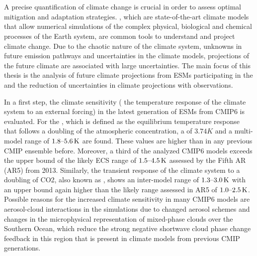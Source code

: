 


\chapter{\abstractname}

A precise quantification of climate change is crucial in order to assess
optimal mitigation and adaptation strategies. , which are
state-of-the-art climate models that allow numerical simulations of the complex
physical, biological and chemical processes of the Earth system, are common
tools to understand and project climate change. Due to the chaotic nature of
the climate system, unknowns in future emission pathways and uncertainties in
the climate models, projections of the future climate are associated with large
uncertainties. The main focus of this thesis is the analysis of future climate
projections from \acsp{ESM} participating in the  and the
reduction of uncertainties in climate projections with observations.

In a first step, the climate sensitivity (\ie{} the temperature response of the
climate system to an external forcing) in the latest generation of \acsp{ESM}
from \acs{CMIP}6 is evaluated. For the , which is defined as
the equilibrium temperature response that follows a doubling of the atmospheric
 concentration, a  of $3.74 \unit{K}$ and a
multi-model range of $\rangeunit{1.8}{5.6}{K}$ are found. These values are
higher than in any previous \acs{CMIP} ensemble before. Moreover, a third of
the analyzed \acs{CMIP}6 models exceeds the upper bound of the likely \acs{ECS}
range of $\rangeunit{1.5}{4.5}{K}$ assessed by the  Fifth
\acl{AR} (\acs{AR}5) from 2013. Similarly, the transient response of the
climate system to a doubling of \acs{CO2}, also known as ,
shows an inter-model range of $\rangeunit{1.3}{3.0}{K}$ with an upper bound
again higher than the likely range assessed in \acs{AR}5 of
$\rangeunit{1.0}{2.5}{K}$. Possible reasons for the increased climate
sensitivity in many \acs{CMIP}6 models are aerosol-cloud interactions in the
simulations due to changed aerosol schemes and changes in the microphysical
representation of mixed-phase clouds over the Southern Ocean, which reduce the
strong negative shortwave cloud phase change feedback in this region that is
present in climate models from previous \acs{CMIP} generations.

